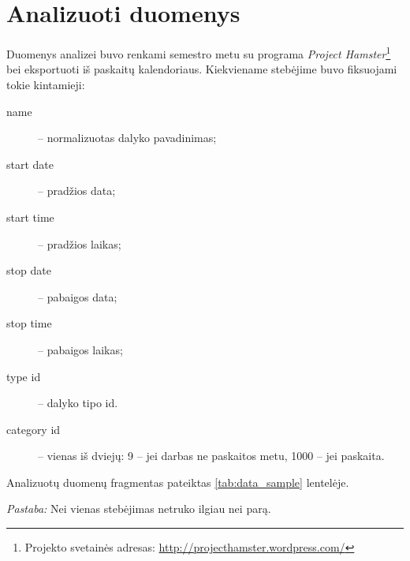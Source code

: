 \chapter{Analizuoti duomenys}

Duomenys analizei buvo renkami semestro metu su programa
\emph{Project Hamster}\footnote{
Projekto svetainės adresas: \url{http://projecthamster.wordpress.com/}}
bei eksportuoti iš paskaitų kalendoriaus. Kiekviename stebėjime buvo
fiksuojami tokie kintamieji:
\begin{description}
  \item[name] – normalizuotas dalyko pavadinimas;
  \item[start date] – pradžios data;
  \item[start time] – pradžios laikas;
  \item[stop date] – pabaigos data;
  \item[stop time] – pabaigos laikas;
  \item[type id] – dalyko tipo id.
  \item[category id] – vienas iš dviejų: 9 – jei darbas ne paskaitos metu, 
    1000 – jei paskaita.
\end{description}
Analizuotų duomenų fragmentas pateiktas \ref{tab:data_sample} lentelėje.

\emph{Pastaba:} Nei vienas stebėjimas netruko ilgiau nei parą.


